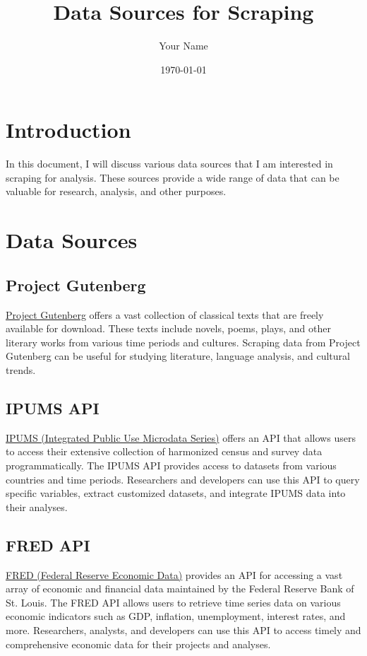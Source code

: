 \documentclass{article}
\title{Data Sources for Scraping}
\author{Your Name}
\date{\today}
\begin{document}
\maketitle

\section{Introduction}
In this document, I will discuss various data sources that I am interested in scraping for analysis. These sources provide a wide range of data that can be valuable for research, analysis, and other purposes.

\section{Data Sources}
\subsection{Project Gutenberg}
\href{https://www.gutenberg.org/}{Project Gutenberg} offers a vast collection of classical texts that are freely available for download. These texts include novels, poems, plays, and other literary works from various time periods and cultures. Scraping data from Project Gutenberg can be useful for studying literature, language analysis, and cultural trends.

\subsection{IPUMS API}
\href{https://www.ipums.org/}{IPUMS (Integrated Public Use Microdata Series)} offers an API that allows users to access their extensive collection of harmonized census and survey data programmatically. The IPUMS API provides access to datasets from various countries and time periods. Researchers and developers can use this API to query specific variables, extract customized datasets, and integrate IPUMS data into their analyses.

\subsection{FRED API}
\href{https://fred.stlouisfed.org/docs/api/fred/}{FRED (Federal Reserve Economic Data)} provides an API for accessing a vast array of economic and financial data maintained by the Federal Reserve Bank of St. Louis. The FRED API allows users to retrieve time series data on various economic indicators such as GDP, inflation, unemployment, interest rates, and more. Researchers, analysts, and developers can use this API to access timely and comprehensive economic data for their projects and analyses.
\end{document}
